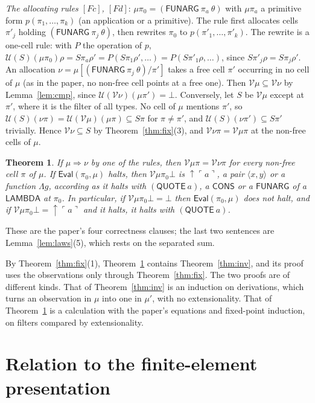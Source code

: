 \documentclass[11pt]{amsart}
\newtheorem{theorem}{Theorem}[section]
\theoremstyle{definition}
\theoremstyle{remark}
\newcommand{\kw}[1]{\mathsf{#1}}
\newcommand{\at}[1]{\ulcorner #1\urcorner}
\newcommand{\V}{\mathcal V}
\newcommand{\U}{\mathcal U}
\newcommand{\up}{{\uparrow}}
\begin{document}
\noindent\emph{The allocating rules $[Fc]$, $[Fd]$}: $\mu\pi_0=(\kw{FUNARG}\ \pi_a\ \theta)$
with $\mu\pi_a$ a primitive form $p(\pi_1,\dots,\pi_k)$ (an application or a
primitive). The rule first allocates cells $\pi'_j$ holding
$(\kw{FUNARG}\ \pi_j\ \theta)$, then rewrites $\pi_0$ to $p(\pi'_1,\dots,\pi'_k)$.
The rewrite is a one-cell rule: with $P$ the operation of $p$,
$\U(S)(\mu\pi_0)\rho=S\pi_a\rho'=P(S\pi_1\rho',\dots)=P(S\pi'_1\rho,\dots)$,
since $S\pi'_j\rho=S\pi_j\rho'$. An allocation $\nu=\mu[(\kw{FUNARG}\ \pi_j\ \theta)/\pi']$
takes a free cell $\pi'$ occurring in no cell of $\mu$ (as in the paper, no
non-free cell points at a free one). Then $\V\mu\subseteq\V\nu$ by
Lemma~\ref{lem:cmp}, since $\U(\V\nu)(\mu\pi')=\bot$. Conversely, let $S$ be
$\V\mu$ except at $\pi'$, where it is the filter of all types. No cell of
$\mu$ mentions $\pi'$, so $\U(S)(\nu\pi)=\U(\V\mu)(\mu\pi)\subseteq S\pi$
for $\pi\ne\pi'$, and $\U(S)(\nu\pi')\subseteq S\pi'$ trivially. Hence
$\V\nu\subseteq S$ by Theorem~\ref{thm:fix}(3), and $\V\nu\pi=\V\mu\pi$ at
the non-free cells of $\mu$.

\begin{theorem}\label{thm:hm}
If $\mu\Rightarrow\nu$ by one of the rules, then $\V\mu\pi=\V\nu\pi$ for
every non-free cell $\pi$ of $\mu$. If $\kw{Eval}(\pi_0,\mu)$ halts, then
$\V\mu\pi_0\bot$ is $\up\at a$, a pair $\langle x,y\rangle$ or a function
$\Lambda g$, according as it halts with $(\kw{QUOTE}\ a)$, a $\kw{CONS}$ or a
$\kw{FUNARG}$ of a $\kw{LAMBDA}$ at $\pi_0$. In particular, if
$\V\mu\pi_0\bot=\bot$ then $\kw{Eval}(\pi_0,\mu)$ does not halt, and if
$\V\mu\pi_0\bot=\up\at a$ and it halts, it halts with $(\kw{QUOTE}\ a)$.
\end{theorem}

\noindent These are the paper's four correctness clauses; the last two
sentences are Lemma~\ref{lem:laws}(5), which rests on the separated sum.

By Theorem~\ref{thm:fix}(1), Theorem~\ref{thm:hm} contains
Theorem~\ref{thm:inv}, and its proof uses the observations only through
Theorem~\ref{thm:fix}. The two proofs are of different kinds. That of
Theorem~\ref{thm:inv} is an induction on derivations, which turns an
observation in $\mu$ into one in $\mu'$, with no extensionality. That of
Theorem~\ref{thm:hm} is a calculation with the paper's equations and
fixed-point induction, on filters compared by extensionality.

\section{Relation to the finite-element presentation}
\end{document}
